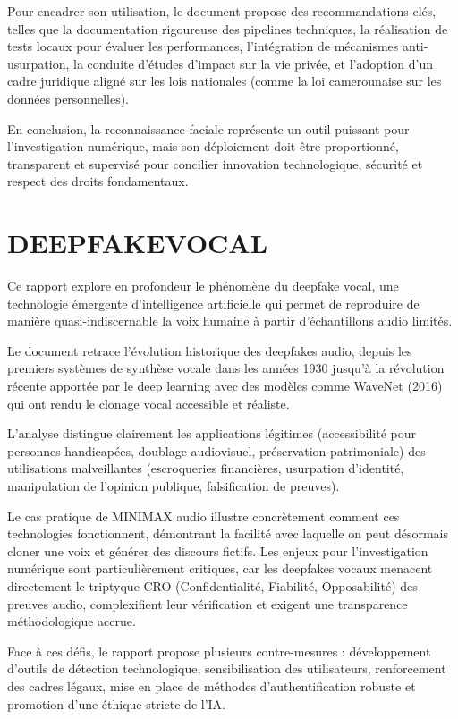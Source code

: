\documentclass[12pt,a4paper]{article}
\begin{document}
Pour encadrer son utilisation, le document propose des recommandations clés, telles que la documentation rigoureuse des pipelines techniques, la réalisation de tests locaux pour évaluer les performances, l'intégration de mécanismes anti-usurpation, la conduite d'études d'impact sur la vie privée, et l'adoption d'un cadre juridique aligné sur les lois nationales (comme la loi camerounaise sur les données personnelles). 

En conclusion, la reconnaissance faciale représente un outil puissant pour l'investigation numérique, mais son déploiement doit être proportionné, transparent et supervisé pour concilier innovation technologique, sécurité et respect des droits fondamentaux.

\section{DEEPFAKEVOCAL}

Ce rapport explore en profondeur le phénomène du deepfake vocal, une technologie émergente d'intelligence artificielle qui permet de reproduire de manière quasi-indiscernable la voix humaine à partir d'échantillons audio limités. 

Le document retrace l'évolution historique des deepfakes audio, depuis les premiers systèmes de synthèse vocale dans les années 1930 jusqu'à la révolution récente apportée par le deep learning avec des modèles comme WaveNet (2016) qui ont rendu le clonage vocal accessible et réaliste. 

L'analyse distingue clairement les applications légitimes (accessibilité pour personnes handicapées, doublage audiovisuel, préservation patrimoniale) des utilisations malveillantes (escroqueries financières, usurpation d'identité, manipulation de l'opinion publique, falsification de preuves). 

Le cas pratique de MINIMAX audio illustre concrètement comment ces technologies fonctionnent, démontrant la facilité avec laquelle on peut désormais cloner une voix et générer des discours fictifs. Les enjeux pour l'investigation numérique sont particulièrement critiques, car les deepfakes vocaux menacent directement le triptyque CRO (Confidentialité, Fiabilité, Opposabilité) des preuves audio, complexifient leur vérification et exigent une transparence méthodologique accrue. 

Face à ces défis, le rapport propose plusieurs contre-mesures : développement d'outils de détection technologique, sensibilisation des utilisateurs, renforcement des cadres légaux, mise en place de méthodes d'authentification robuste et promotion d'une éthique stricte de l'IA. 
\end{document}
